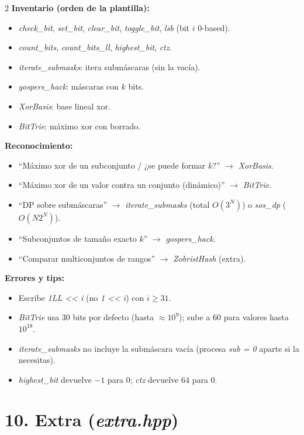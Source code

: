 \documentclass[10pt]{article}
\begin{document}
\begin{multicols}{2}
\textbf{Inventario (orden de la plantilla):}
\begin{itemize}\setlength{\itemsep}{1pt}
  \item \textit{check\_bit}, \textit{set\_bit}, \textit{clear\_bit}, \textit{toggle\_bit}, \textit{lsb} (bit $i$ 0-based).
  \item \textit{count\_bits}, \textit{count\_bits\_ll}, \textit{highest\_bit}, \textit{ctz}.
  \item \textit{iterate\_submasks}: itera submáscaras (sin la vacía).
  \item \textit{gospers\_hack}: máscaras con $k$ bits.
  \item \textit{XorBasis}: base lineal xor.
  \item \textit{BitTrie}: máximo xor con borrado.
\end{itemize}

\textbf{Reconocimiento:}
\begin{itemize}\setlength{\itemsep}{1pt}
  \item ``Máximo xor de un subconjunto / ¿se puede formar $k$?'' $\to$ \textit{XorBasis}.
  \item ``Máximo xor de un valor contra un conjunto (dinámico)'' $\to$ \textit{BitTrie}.
  \item ``DP sobre submáscaras'' $\to$ \textit{iterate\_submasks} (total $O(3^N)$) o \textit{sos\_dp} ($O(N 2^N)$).
  \item ``Subconjuntos de tamaño exacto $k$'' $\to$ \textit{gospers\_hack}.
  \item ``Comparar multiconjuntos de rangos'' $\to$ \textit{ZobristHash} (extra).
\end{itemize}

\textbf{Errores y tips:}
\begin{itemize}\setlength{\itemsep}{1pt}
  \item Escribe \textit{1LL << i} (no \textit{1 << i}) con $i \ge 31$.
  \item \textit{BitTrie} usa 30 bits por defecto (hasta $\approx 10^9$); sube a 60 para valores hasta $10^{18}$.
  \item \textit{iterate\_submasks} no incluye la submáscara vacía (procesa \textit{sub = 0} aparte si la necesitas).
  \item \textit{highest\_bit} devuelve $-1$ para 0; \textit{ctz} devuelve 64 para 0.
\end{itemize}

\section*{10. Extra (\textit{extra.hpp})}


\end{multicols}
\end{document}
